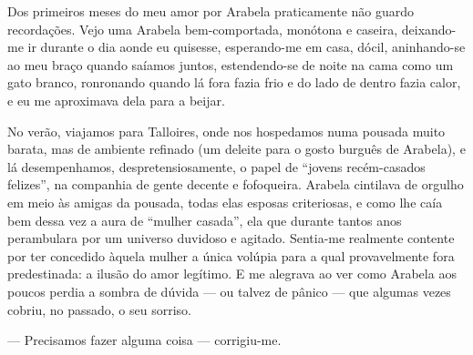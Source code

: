 Dos primeiros meses do meu amor por Arabela praticamente não guardo
recordações. Vejo uma Arabela bem-comportada, monótona e caseira,
deixando-me ir durante o dia aonde eu quisesse, esperando-me em casa,
dócil, aninhando-se ao meu braço quando saíamos juntos, estendendo-se de
noite na cama como um gato branco, ronronando quando lá fora fazia frio
e do lado de dentro fazia calor, e eu me aproximava dela para a beijar.



No verão, viajamos para Talloires, onde nos hospedamos numa pousada
muito barata, mas de ambiente refinado (um deleite para o gosto burguês
de Arabela), e lá desempenhamos, despretensiosamente, o papel de
``jovens recém-casados felizes'', na companhia de gente decente e
fofoqueira. Arabela cintilava de orgulho em meio às amigas da pousada,
todas elas esposas criteriosas, e como lhe caía bem dessa vez a aura de
``mulher casada'', ela que durante tantos anos perambulara por um
universo duvidoso e agitado. Sentia-me realmente contente por ter
concedido àquela mulher a única volúpia para a qual provavelmente fora
predestinada: a ilusão do amor legítimo. E me alegrava ao ver como
Arabela aos poucos perdia a sombra de dúvida --- ou talvez de pânico ---
que algumas vezes cobriu, no passado, o seu sorriso.



--- Precisamos fazer alguma coisa --- corrigiu-me.


